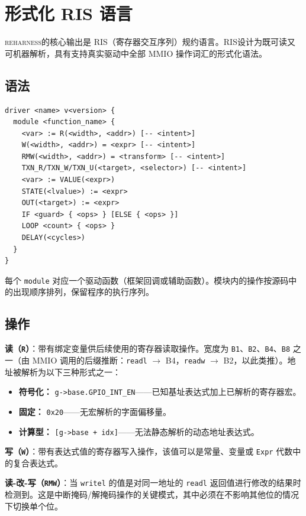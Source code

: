 \documentclass[sigplan, screen, review, anonymous]{acmart}
\newcommand{\reharness}{\textsc{reharness}}
\newcommand{\rislang}{RIS}
\begin{document}
\section{形式化 RIS 语言}

\reharness 的核心输出是 \rislang（寄存器交互序列）规约语言。\rislang 设计为既可读又可机器解析，具有支持真实驱动中全部 MMIO 操作词汇的形式化语法。

\subsection{语法}

\begin{lstlisting}[language=ris]
driver <name> v<version> {
  module <function_name> {
    <var> := R(<width>, <addr>) [-- <intent>]
    W(<width>, <addr>) = <expr> [-- <intent>]
    RMW(<width>, <addr>) = <transform> [-- <intent>]
    TXN_R/TXN_W/TXN_U(<target>, <selector>) [-- <intent>]
    <var> := VALUE(<expr>)
    STATE(<lvalue>) := <expr>
    OUT(<target>) := <expr>
    IF <guard> { <ops> } [ELSE { <ops> }]
    LOOP <count> { <ops> }
    DELAY(<cycles>)
  }
}
\end{lstlisting}

每个 \texttt{module} 对应一个驱动函数（框架回调或辅助函数）。模块内的操作按源码中的出现顺序排列，保留程序的执行序列。

\subsection{操作}

\textbf{读（\texttt{R}）}：带有绑定变量供后续使用的寄存器读取操作。宽度为 \texttt{B1}、\texttt{B2}、\texttt{B4}、\texttt{B8} 之一（由 MMIO 调用的后缀推断：\texttt{readl} $\rightarrow$ B4，\texttt{readw} $\rightarrow$ B2，以此类推）。地址被解析为以下三种形式之一：

\begin{itemize}
\item \textbf{符号化：} \texttt{g->base.GPIO\_INT\_EN}——已知基址表达式加上已解析的寄存器宏。
\item \textbf{固定：} \texttt{0x20}——无宏解析的字面偏移量。
\item \textbf{计算型：} \texttt{[g->base + idx]}——无法静态解析的动态地址表达式。
\end{itemize}

\textbf{写（\texttt{W}）}：带有表达式值的寄存器写入操作，该值可以是常量、变量或 \texttt{Expr} 代数中的复合表达式。

\textbf{读-改-写（\texttt{RMW}）}：当 \texttt{writel} 的值是对同一地址的 \texttt{readl} 返回值进行修改的结果时检测到。这是中断掩码/解掩码操作的关键模式，其中必须在不影响其他位的情况下切换单个位。
\end{document}
